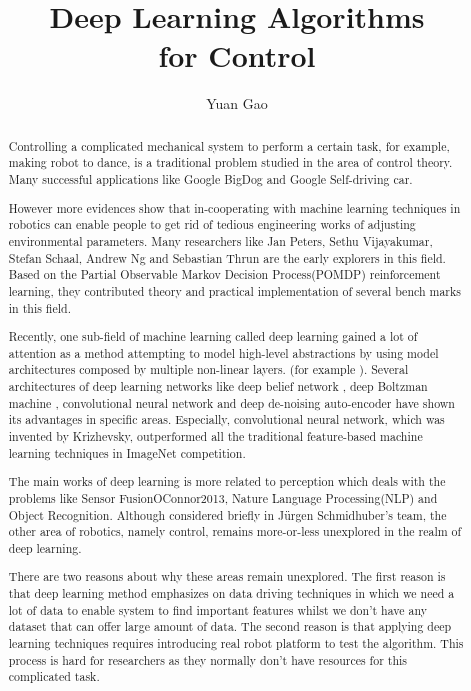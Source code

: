 \documentclass[officiallayout]{tktla}
\title{Deep Learning Algorithms \\ for Control}
\author{Yuan Gao}
\begin{document}
\frontmatter
\maketitle
\begin{abstract}
Controlling a complicated mechanical system to perform a certain task, for example, making robot to dance, is a traditional problem studied in the area of control theory. Many successful applications like Google BigDog\cite{Raibert2008} and Google Self-driving car.

However more evidences show that in-cooperating with machine learning techniques in robotics can enable people to get rid of tedious engineering works of adjusting environmental parameters. Many researchers like Jan Peters, Sethu Vijayakumar, Stefan Schaal, Andrew Ng and Sebastian Thrun are the early explorers in this field. Based on the Partial Observable Markov Decision Process(POMDP) reinforcement learning, they contributed theory and practical implementation of several bench marks in this field.

Recently, one sub-field of machine learning called deep learning gained a lot of attention as a method attempting to model high-level abstractions by using model architectures composed by multiple non-linear layers. (for example \cite{Krizhevsky2012}). Several architectures of deep learning networks like deep belief network \cite{Hinton2006}, deep Boltzman machine \cite{Salakhutdinov2009}, convolutional neural network \cite{Krizhevsky2012} and deep de-noising auto-encoder \cite{Vincent2010} have shown its advantages in specific areas. Especially, convolutional neural network, which was invented by Krizhevsky, outperformed all the traditional feature-based machine learning techniques in ImageNet competition.

The main works of deep learning is more related to perception which deals with the problems like Sensor Fusion{OConnor2013}, Nature Language Processing(NLP)\cite{Cho2014} and Object Recognition\cite{Lenz2013}\cite{Hoffman2014}. Although considered briefly in J{\"u}rgen Schmidhuber's team\cite{Mayer2006}, the other area of robotics, namely control, remains more-or-less unexplored in the realm of deep learning.

There are two reasons about why these areas remain unexplored. The first reason is that deep learning method emphasizes on data driving techniques in which we need a lot of data to enable system to find important features whilst we don't have any dataset that can offer large amount of data. The second reason is that applying deep learning techniques requires introducing real robot platform to test the algorithm. This process is hard for researchers as they normally don't have resources for this complicated task.


\end{abstract}
\end{document}
